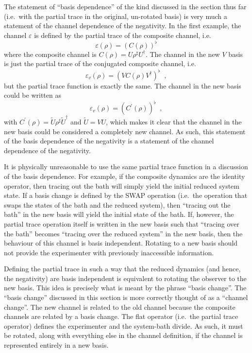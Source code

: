 The statement of ``basis dependence'' of the kind discussed in the section thus far (i.e.\ with the partial trace in the original, un-rotated basis) is very much a statement of the channel dependence of the negativity.  In the first example, the channel $\varepsilon$ is defined by the partial trace of the composite channel, i.e.\
$$
\varepsilon(\rho) = \left(C(\rho)\right)^\flat
$$
where the composite channel is $C(\rho) = U\rho^\sharp U^\dagger$.  The channel in the new $V$ basis is just the partial trace of the conjugated composite channel, i.e.\
$$
\varepsilon_v(\rho) = \left(VC(\rho)V^\dagger\right)^\flat\;\;,
$$
but the partial trace function is exactly the same.  The channel in the new basis could be written as 
$$
\varepsilon_v(\rho) = \left(C^\prime(\rho)\right)^\flat\;\;,
$$
with $C^\prime(\rho) = \tilde{U}\rho^\sharp \tilde{U}^\dagger$ and $\tilde{U}=VU$, which makes it clear that the channel in the new basis could be considered a completely new channel.  As such, this statement of the basis dependence of the negativity is a statement of the channel dependence of the negativity.

It is physically unreasonable to use the same partial trace function in a discussion of the basis dependence.  For example, if the composite dynamics are the identity operator, then tracing out the bath will simply yield the initial reduced system state.  If a basis change is defined by the SWAP operation (i.e.\ the operation that swaps the states of the bath and the reduced system), then ``tracing out the bath'' in the new basis will yield the initial state of the bath.  If, however, the partial trace operation itself is written in the new basis such that ``tracing over the bath'' becomes ``tracing over the reduced system'' in the new basis, then the behaviour of this channel is basis independent.  Rotating to a new basis should not provide the experimenter with previously inaccessible information.  

Defining the partial trace in such a way that the reduced dynamics (and hence, the negativity) are basis independent is equivalent to rotating the observer to the new basis.  This idea is precisely what is meant by the phrase ``basis change''.  The ``basis change'' discussed in this section is more correctly thought of as a ``channel change''.  The new channel is related to the old channel because the composite channels are related by a basis change.  The flat operator (i.e.\ the partial trace operator) defines the experimenter and the system-bath divide.  As such, it must be rotated, along with everything else in the channel definition, if the channel is represented entirely in a new basis.  

